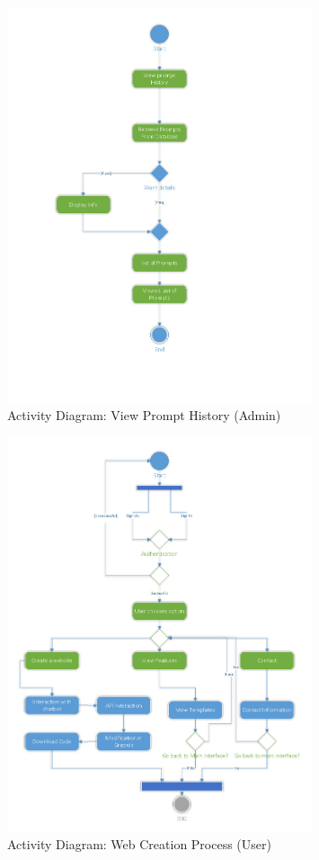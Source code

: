 \documentclass[12pt]{report}
\begin{document}
\begin{figure}[ht]
    \centering
    \includegraphics[width=0.8\textwidth]{Media/Binder2.pdf_Page_04.jpg} %
    \caption{Activity Diagram: View Prompt History (Admin)}
    \label{fig:drawing1}
\end{figure}

\begin{figure}[ht]
    \centering
    \includegraphics[width=0.8\textwidth]{Media/Binder2.pdf_Page_05.jpg} %
    \caption{Activity Diagram: Web Creation Process (User)}
    \label{fig:drawing1}
\end{figure}
\end{document}
